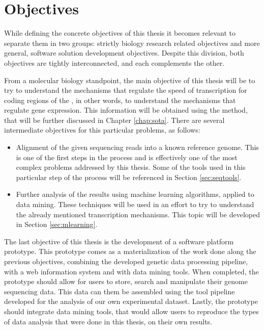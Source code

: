 \section{Objectives} \label{sec:goals}

While defining the concrete objectives of this thesis it becomes relevant to
separate them in two groups: strictly biology research related objectives and
more general, software solution development objectives. Despite this division,
both objectives are tightly interconnected, and each complements the other.

From a molecular biology standpoint, the main objective of this thesis will be
to try to understand the mechanisms that regulate the speed of transcription for
coding regions of the \dna, in other words, to understand the mechanisms that
regulate gene expression. This information will be obtained using the \rnaseq{}
method, that will be further discussed in Chapter \ref{chap:sota}. There are
several intermediate objectives for this particular problems, as follows:

\begin{itemize}

  \item
  Alignment of the given sequencing reads into a known reference genome. This is
  one of the first steps in the \rnaseq{} process and is effectively one of the
  most complex problems addressed by this thesis. Some of the tools used in this
  particular step of the process will be referenced in Section \ref{sec:seqtools}.

  \item
  Further analysis of the \rnaseq{} results using machine learning algorithms,
  applied to data mining. These techniques will be used in an effort to try to
  understand the already mentioned transcription mechanisms. This topic will be
  developed in Section \ref{sec:mlearning}.

\end{itemize}

The last objective of this thesis is the development of a software platform
prototype. This prototype comes as a materialization of the work done along the
previous objectives, combining the developed genetic data processing pipeline,
with a web information system and with data mining tools. When completed, the
prototype should allow for users to store, search and manipulate their genome
sequencing data. This data can them be assembled using the tool pipeline
developed for the analysis of our own experimental dataset. Lastly, the
prototype should integrate data mining tools, that would allow users to
reproduce the types of data analysis that were done in this thesis, on their own
results.

